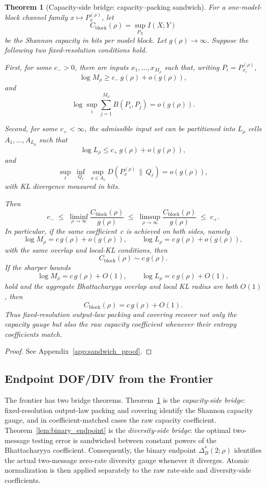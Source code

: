 \documentclass[lettersize,onecolumn]{IEEEtran}
\newtheorem{theorem}{Theorem}
\newcommand{\snr}{\rho}
\begin{document}
\begin{theorem}[Capacity-side bridge: capacity--packing sandwich]\label{lem:sandwich}
For a one-model-block channel family $x \mapsto P_x^{(\snr)}$, let
\[
C_{\mathrm{block}}(\snr) = \sup_{P_X} I(X;Y)
\]
be the Shannon capacity in bits per model block. Let
$g(\snr) \to \infty$. Suppose the following two fixed-resolution
conditions hold.

\emph{First}, for some $c_- > 0$, there are inputs
$x_1,\dots,x_{M_\snr}$ such that, writing
$P_i = P_{x_i}^{(\snr)}$,
\[
\log M_\snr \ge c_-\,g(\snr) + o(g(\snr)),
\]
and
\[
\log\!\sup_i \sum_{j=1}^{M_\snr} B(P_i, P_j) = o(g(\snr)).
\]

\emph{Second}, for some $c_+ < \infty$, the admissible input set can
be partitioned into $L_\snr$ cells $A_1,\dots,A_{L_\snr}$ such that
\[
\log L_\snr \le c_+\,g(\snr) + o(g(\snr)),
\]
and
\[
\sup_\ell\;\inf_{Q_\ell}\;\sup_{x \in A_\ell}
D\!\left(P_x^{(\snr)} \,\big\|\, Q_\ell\right) = o(g(\snr)),
\]
with KL divergence measured in bits.

Then
\[
c_- \;\le\;
\liminf_{\snr\to\infty} \frac{C_{\mathrm{block}}(\snr)}{g(\snr)}
\;\le\;
\limsup_{\snr\to\infty} \frac{C_{\mathrm{block}}(\snr)}{g(\snr)}
\;\le\; c_+.
\]
In particular, if the same coefficient~$c$ is achieved on both sides,
namely
\[
\log M_\snr = c\,g(\snr) + o(g(\snr)),\qquad
\log L_\snr = c\,g(\snr) + o(g(\snr)),
\]
with the same overlap and local-KL conditions, then
\[
C_{\mathrm{block}}(\snr) \sim c\,g(\snr).
\]
If the sharper bounds
\[
\log M_\snr = c\,g(\snr) + O(1),\qquad
\log L_\snr = c\,g(\snr) + O(1),
\]
hold and the aggregate Bhattacharyya overlap and local KL radius are
both $O(1)$, then
\[
C_{\mathrm{block}}(\snr) = c\,g(\snr) + O(1).
\]
Thus fixed-resolution output-law packing and covering recover not only
the capacity gauge but also the raw capacity coefficient whenever
their entropy coefficients match.
\end{theorem}
\begin{proof}
See Appendix~\ref{app:sandwich_proof}.
\end{proof}

\subsection{Endpoint DOF/DIV from the Frontier}\label{subsec:endpoint_dofdiv}

The frontier has two bridge theorems.
Theorem~\ref{lem:sandwich} is the \emph{capacity-side bridge}:
fixed-resolution output-law packing and covering identify the Shannon
capacity gauge, and in coefficient-matched cases the raw capacity
coefficient. Theorem~\ref{lem:binary_endpoint} is the
\emph{diversity-side bridge}: the optimal two-message testing error is
sandwiched between constant powers of the Bhattacharyya coefficient.
Consequently, the binary endpoint $\Delta_B^*(2;\snr)$ identifies the
actual two-message zero-rate diversity gauge whenever it diverges.
Atomic normalization is then applied separately to the raw rate-side
and diversity-side coefficients.
\end{document}
